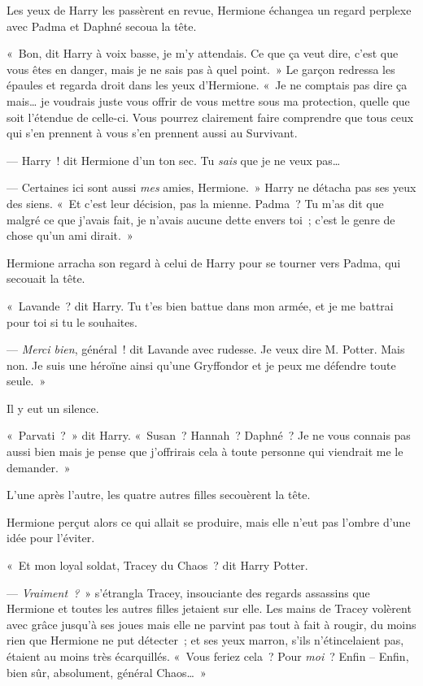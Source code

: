 Les yeux de Harry les passèrent en revue, Hermione échangea un regard perplexe avec Padma et Daphné secoua la tête.

«~Bon, dit Harry à voix basse, je m'y attendais. Ce que ça veut dire, c'est que vous êtes en danger, mais je ne sais pas à quel point.~» Le garçon redressa les épaules et regarda droit dans les yeux d'Hermione. «~Je ne comptais pas dire ça mais… je voudrais juste vous offrir de vous mettre sous ma protection, quelle que soit l'étendue de celle-ci. Vous pourrez clairement faire comprendre que tous ceux qui s'en prennent à vous s'en prennent aussi au Survivant.

--- Harry~! dit Hermione d'un ton sec. Tu \emph{sais} que je ne veux pas…

--- Certaines ici sont aussi \emph{mes} amies, Hermione.~» Harry ne détacha pas ses yeux des siens. «~Et c'est leur décision, pas la mienne. Padma~? Tu m'as dit que malgré ce que j'avais fait, je n'avais aucune dette envers toi~; c'est le genre de chose qu'un ami dirait.~»

Hermione arracha son regard à celui de Harry pour se tourner vers Padma, qui secouait la tête.

«~Lavande~? dit Harry. Tu t'es bien battue dans mon armée, et je me battrai pour toi si tu le souhaites.

--- \emph{Merci bien}, général~! dit Lavande avec rudesse. Je veux dire M. Potter. Mais non. Je suis une héroïne ainsi qu'une Gryffondor et je peux me défendre toute seule.~»

Il y eut un silence.

«~Parvati~?~» dit Harry. «~Susan~? Hannah~? Daphné~? Je ne vous connais pas aussi bien mais je pense que j'offrirais cela à toute personne qui viendrait me le demander.~»

L'une après l'autre, les quatre autres filles secouèrent la tête.

Hermione perçut alors ce qui allait se produire, mais elle n'eut pas l'ombre d'une idée pour l'éviter.

«~Et mon loyal soldat, Tracey du Chaos~? dit Harry Potter.

--- \emph{Vraiment~?}~» s'étrangla Tracey, insouciante des regards assassins que Hermione et toutes les autres filles jetaient sur elle. Les mains de Tracey volèrent avec grâce jusqu'à ses joues mais elle ne parvint pas tout à fait à rougir, du moins rien que Hermione ne put détecter~; et ses yeux marron, s'ils n'étincelaient pas, étaient au moins très écarquillés. «~Vous feriez cela~? Pour \emph{moi}~? Enfin -- Enfin, bien sûr, absolument, général Chaos…~»

